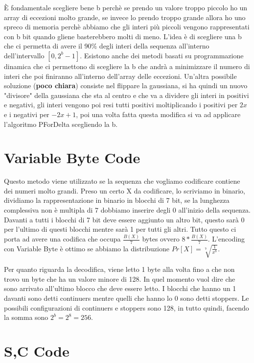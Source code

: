 \documentclass[14pt]{extreport}
\begin{document}
È fondamentale scegliere bene b perchè se prendo un valore troppo piccolo ho un array di eccezioni molto grande, se invece lo prendo troppo grande allora ho uno spreco di memoria perchè abbiamo che gli interi più piccoli vengono rappresentati con b bit quando gliene basterebbero molti di meno.
L'idea è di scegliere una b che ci permetta di avere il 90\% degli interi della sequenza all'interno dell'intervallo $[0,2^b-1]$.
Esistono anche dei metodi basati su programmazione dinamica che ci permettono di scegliere la b che andrà a minimizzare il numero di interi che poi finiranno all'interno dell'array delle eccezioni.
Un'altra possibile soluzione (\textbf{poco chiara}) consiste nel flippare la gaussiana, si ha quindi un nuovo "divisore" della gaussiana che sta al centro e che va a dividere gli interi in positivi e negativi, gli interi vengono poi resi tutti positivi moltiplicando i positivi per $2x$ e i negativi per $-2x+1$, poi una volta fatta questa modifica si va ad applicare l'algoritmo PForDelta scegliendo la b.


\section{Variable Byte Code}

Questo metodo viene utilizzato se la sequenza che vogliamo codificare contiene dei numeri molto grandi.
Preso un certo X da codificare, lo scriviamo in binario, dividiamo la rappresentazione in binario in blocchi di 7 bit, se la lunghezza complessiva non è multipla di 7 dobbiamo inserire degli 0 all'inizio della sequenza.
Davanti a tutti i blocchi di 7 bit deve essere aggiunto un altro bit, questo sarà 0 per l'ultimo di questi blocchi mentre sarà 1 per tutti gli altri.
Tutto questo ci porta ad avere una codifica che occupa $\frac{B(X)}{7}$ bytes ovvero $8*\frac{B(X)}{7}$.
L'encoding con Variable Byte è ottimo se abbiamo la distribuzione $Pr[X] = \sqrt[7]{\frac{1}{x^8}}$.

Per quanto riguarda la decodifica, viene letto 1 byte alla volta fino a che non trovo un byte che ha un valore minore di 128. In quel momento vuol dire che sono arrivato all'ultimo blocco che deve essere letto.
I blocchi che hanno un 1 davanti sono detti continuers mentre quelli che hanno lo 0 sono detti stoppers.
Le possibili configurazioni di continuers e stoppers sono 128, in tutto quindi, facendo la somma sono $2^b=2^8=256$.


\section{S,C Code}
\end{document}

